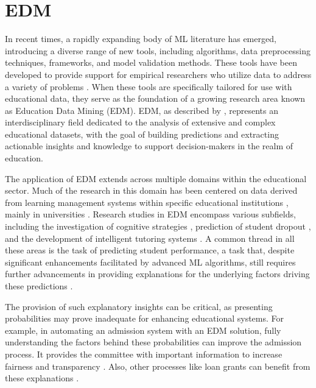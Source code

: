 \section{EDM}

In recent times, a rapidly expanding body of \gls{ML} literature has emerged, introducing a diverse range of new tools, including algorithms, data preprocessing techniques, frameworks, and model validation methods. These tools have been developed to provide support for empirical researchers who utilize data to address a variety of problems \cite{Athey2019MachineAbout}. When these tools are specifically tailored for use with educational data, they serve as the foundation of a growing research area known as Education Data Mining (\gls{EDM}). \gls{EDM}, as described by \cite{Romero2020EducationalSurvey}, represents an interdisciplinary field dedicated to the analysis of extensive and complex educational datasets, with the goal of building predictions and extracting actionable insights and knowledge to support decision-makers in the realm of education.

The application of \gls{EDM} extends across multiple domains within the educational sector. Much of the research in this domain has been centered on data derived from learning management systems within specific educational institutions \cite{Fischer2020MiningChallenges}, mainly in universities \cite{Romero2020EducationalSurvey}. Research studies in \gls{EDM} encompass various subfields, including the investigation of cognitive strategies \cite{Fancsali2018IntelligentOffs, Moussavi2016TheTopics}, prediction of student dropout \cite{Chaturapruek2018HowGPA, Jayaprakash2014EarlyInitiative}, and the development of intelligent tutoring systems \cite{Jiang2019Goal-basedRecommendation}. A common thread in all these areas is the task of predicting student performance, a task that, despite significant enhancements facilitated by advanced ML algorithms, still requires further advancements in providing explanations for the underlying factors driving these predictions \cite{Yang2021InterpretabilityLearning, Kovalev2020EducationalSolutions}.

The provision of such explanatory insights can be critical, as presenting probabilities may prove inadequate for enhancing educational systems. For example, in automating an admission system with an \gls{EDM} solution, fully understanding the factors behind these probabilities can improve the admission process. It provides the committee with important information to increase fairness and transparency \cite{AlGhamdi2020APrediction, Maulana2023OptimizingPerspective}. Also, other processes like loan grants can benefit from these explanations \cite{Maulana2023OptimizingPerspective}.

